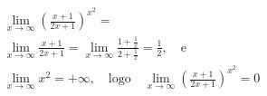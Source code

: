 \begin{ex}
\begin{align}
&\lim_{x\rightarrow \infty} \left(\frac{x+1}{2x+1}\right)^{x^2}=\nonumber\\
&\lim_{x\rightarrow \infty} \frac{x+1}{2x+1}=\lim_{x\rightarrow \infty} \frac{1+\frac{1}{x}}{2+\frac{1}{x}}=\frac{1}{2},\quad\text{e}\nonumber\\
&\lim_{x\rightarrow \infty} x^2 = +\infty,\quad\text{logo}\quad\lim_{x\rightarrow \infty}\left(\frac{x+1}{2x+1}\right)^{x^2}=0\nonumber
\end{align}
\end{ex}